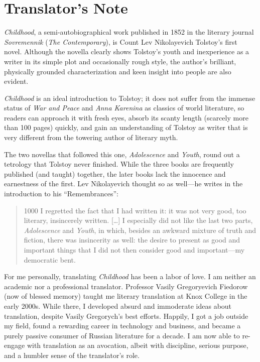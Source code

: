 \chapter{Translator's Note}

\textit{Childhood}, a semi-autobiographical work published in 1852 in the literary journal \textit{Sovremennik} (\textit{The Contemporary}), is Count Lev Nikolayevich Tolstoy's first novel. Although the novella clearly shows Tolstoy's youth and inexperience as a writer in its simple plot and occasionally rough style, the author's brilliant, physically grounded characterization and keen insight into people are also evident.

\textit{Childhood} is an ideal introduction to Tolstoy; it does not suffer from the immense status of \textit{War and Peace} and \textit{Anna Karenina} as classics of world literature, so readers can approach it with fresh eyes, absorb its scanty length (scarcely more than 100 pages) quickly, and gain an understanding of Tolstoy as writer that is very different from the towering author of literary myth.

The two novellas that followed this one, \textit{Adolescence} and \textit{Youth}, round out a tetrology that Tolstoy never finished. While the three books are frequently published (and taught) together, the later books lack the innocence and earnestness of the first. Lev Nikolayevich thought so as well---he writes in the introduction to his ``Remembrances'':

\begin{quotation}
\begin{tolerant}{1000}
I regretted the fact that I had written it: it was not very good, too literary, insincerely written. [\ldots{}] I especially did not like the last two parts, \textit{Adolescence} and \textit{Youth}, in which, besides an awkward mixture of truth and fiction, there was insincerity as well: the desire to present as good and important things that I did not then consider good and important---my democratic bent.
\end{tolerant}
\end{quotation}

For me personally, translating \textit{Childhood} has been a labor of love. I am neither an academic nor a professional translator. Professor Vasily Gregoryevich Fiedorow (now of blessed memory) taught me literary translation at Knox College in the early 2000s. While there, I developed absurd and immoderate ideas about translation, despite Vasily Gregorych's best efforts. Happily, I got a job outside my field, found a rewarding career in technology and business, and became a purely passive consumer of Russian literature for a decade. I am now able to re-engage with translation as an avocation, albeit with discipline, serious purpose, and a humbler sense of the translator's role.

